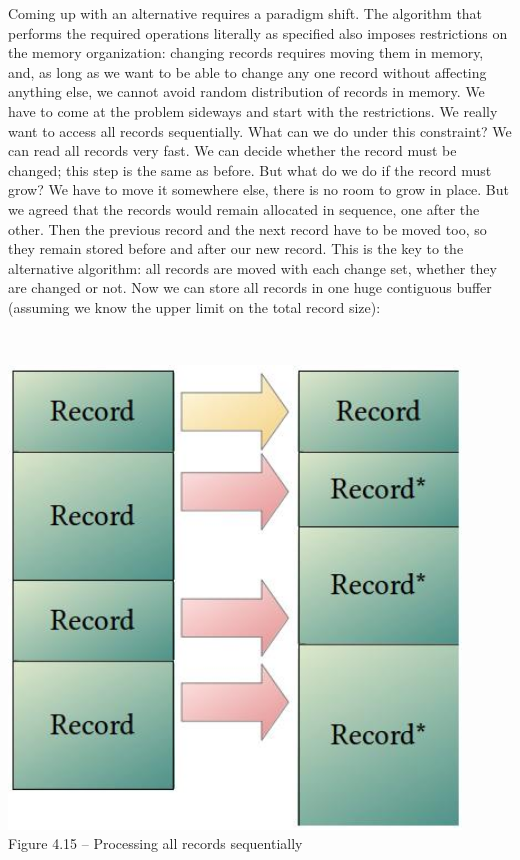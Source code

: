Coming up with an alternative requires a paradigm shift. The algorithm that performs the required operations literally as specified also imposes restrictions on the memory organization: changing records requires moving them in memory, and, as long as we want to be able to change any one record without affecting anything else, we cannot avoid random distribution of records in memory. We have to come at the problem sideways and start with the restrictions. We really want to access all records sequentially. What can we do under this constraint? We can read all records very fast. We can decide whether the record must be changed; this step is the same as before. But what do we do if the record must grow? We have to move it somewhere else, there is no room to grow in place. But we agreed that the records would remain allocated in sequence, one after the other. Then the previous record and the next record have to be moved too, so they remain stored before and after our new record. This is the key to the alternative algorithm: all records are moved with each change set, whether they are changed or not. Now we can store all records in one huge contiguous buffer (assuming we know the upper limit on the total record size):

\hspace*{\fill} \\ %
\begin{center}
\includegraphics[width=0.9\textwidth]{content/1/chapter4/images/15.jpg}\\
Figure 4.15 – Processing all records sequentially
\end{center}

